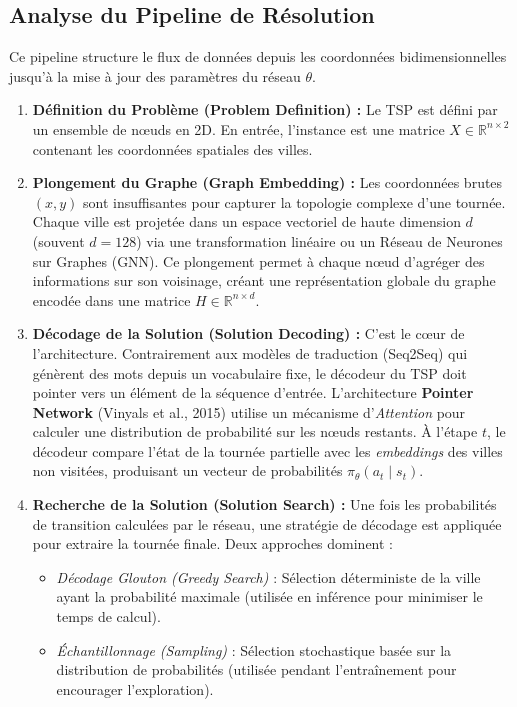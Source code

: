 \documentclass[12pt, a4paper, twoside, openright]{book}
\newcommand{\R}{\mathbb{R}}
\begin{document}
	\subsection{Analyse du Pipeline de Résolution}
	
	Ce pipeline structure le flux de données depuis les coordonnées bidimensionnelles jusqu'à la mise à jour des paramètres du réseau $\theta$.
	
	\begin{enumerate}[label=\textbf{(\alph*)}, leftmargin=*]
		\item \textbf{Définition du Problème (Problem Definition) :} Le TSP est défini par un ensemble de n\oe{}uds en 2D. En entrée, l'instance est une matrice $X \in \R^{n \times 2}$ contenant les coordonnées spatiales des villes.
		
		\item \textbf{Plongement du Graphe (Graph Embedding) :} Les coordonnées brutes $(x,y)$ sont insuffisantes pour capturer la topologie complexe d'une tournée. Chaque ville est projetée dans un espace vectoriel de haute dimension $d$ (souvent $d=128$) via une transformation linéaire ou un Réseau de Neurones sur Graphes (GNN). Ce plongement permet à chaque n\oe{}ud d'agréger des informations sur son voisinage, créant une représentation globale du graphe encodée dans une matrice $H \in \R^{n \times d}$.
		
		\item \textbf{Décodage de la Solution (Solution Decoding) :} C'est le c\oe{}ur de l'architecture. Contrairement aux modèles de traduction (Seq2Seq) qui génèrent des mots depuis un vocabulaire fixe, le décodeur du TSP doit pointer vers un élément de la séquence d'entrée.
		L'architecture \textbf{Pointer Network} (Vinyals et al., 2015) utilise un mécanisme d'\textit{Attention} pour calculer une distribution de probabilité sur les n\oe{}uds restants. À l'étape $t$, le décodeur compare l'état de la tournée partielle avec les \textit{embeddings} des villes non visitées, produisant un vecteur de probabilités $\pi_\theta(a_t \mid s_t)$.
		
		\item \textbf{Recherche de la Solution (Solution Search) :} Une fois les probabilités de transition calculées par le réseau, une stratégie de décodage est appliquée pour extraire la tournée finale. Deux approches dominent :
		\begin{itemize}
			\item \textit{Décodage Glouton (Greedy Search)} : Sélection déterministe de la ville ayant la probabilité maximale (utilisée en inférence pour minimiser le temps de calcul).
			\item \textit{Échantillonnage (Sampling)} : Sélection stochastique basée sur la distribution de probabilités (utilisée pendant l'entraînement pour encourager l'exploration).
		\end{itemize}
		

\end{enumerate}
\end{document}
